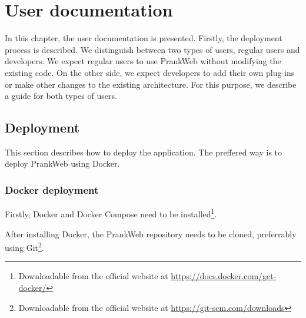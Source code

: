 \chapter{User documentation}
\label{chap:user_docs}

In this chapter, the user documentation is presented. Firstly, the deployment process is described. We distinguish between two types of users, regular users and developers. We expect regular users to use PrankWeb without modifying the existing code. On the other side, we expect developers to add their own plug-ins or make other changes to the existing architecture. For this purpose, we describe a guide for both types of users.

\section{Deployment}
\label{sec:deployment}

This section describes how to deploy the application. The preffered way is to deploy PrankWeb using Docker.

\subsection{Docker deployment}
\label{subsec:docker_deployment}

Firstly, Docker and Docker Compose need to be installed\footnote{Downloadable from the official website at \url{https://docs.docker.com/get-docker/}}. 

After installing Docker, the PrankWeb repository needs to be cloned, preferrably using Git\footnote{Downloadable from the official website at \url{https://git-scm.com/downloads}}.


